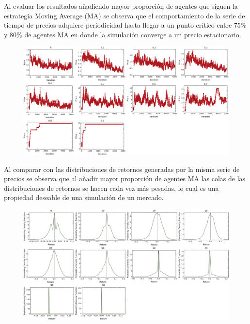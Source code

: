 \markdownRendererInterblockSeparator
{}Al evaluar los resultados añadiendo mayor proporción de agentes que siguen la estrategia Moving Average (MA) se observa que el comportamiento de la serie de tiempo de precios adquiere periodicidad hasta llegar a un punto crítico entre 75\% y 80\% de agentes MA en donde la simulación converge a un precio estacionario.\markdownRendererInterblockSeparator
{}\begin{figure}[h!] \centering \includegraphics[scale=0.4]{img/price_series.png} \end{figure}\markdownRendererInterblockSeparator
{}Al comparar con las distribuciones de retornos generadas por la misma serie de precios se observa que al añadir mayor proporción de agentes MA las colas de las distribuciones de retornos se hacen cada vez más pesadas, lo cual es una propiedad deseable de una simulación de un mercado.\markdownRendererInterblockSeparator
{}\begin{figure}[h!] \centering \includegraphics[scale=0.4]{img/dist_prices.png} \end{figure}\markdownRendererInterblockSeparator
{}\markdownRendererHorizontalRule{}\markdownRendererInterblockSeparator

